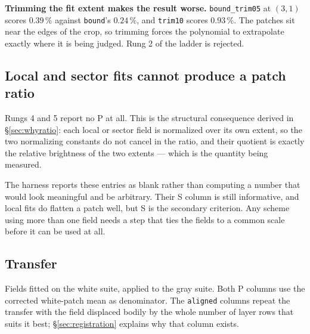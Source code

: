 \documentclass[11pt, a4paper]{article}
\newcommand{\code}[1]{\texttt{#1}}
\newcommand{\pct}{\,\%}
\begin{document}
\textbf{Trimming the fit extent makes the result worse.}
\code{bound\_trim05} at $(3,1)$ scores $0.39\pct$
against \code{bound}'s $0.24\pct$,
and \code{trim10} scores $0.93\pct$.
The patches sit near the edges of the crop,
so trimming forces the polynomial to extrapolate
exactly where it is being judged.
Rung 2 of the ladder is rejected.

\subsection{Local and sector fits cannot produce a patch ratio}
\label{sec:localfail}

Rungs 4 and 5 report no P at all.
This is the structural consequence derived in \S\ref{sec:whyratio}:
each local or sector field is normalized over its own extent,
so the two normalizing constants do not cancel in the ratio,
and their quotient is exactly the relative brightness of the two extents ---
which is the quantity being measured.

The harness reports these entries as blank
rather than computing a number that would look meaningful
and be arbitrary.
Their S column is still informative,
and local fits do flatten a patch well,
but S is the secondary criterion.
Any scheme using more than one field
needs a step that ties the fields to a common scale
before it can be used at all.

\subsection{Transfer}
\label{sec:transfer}

Fields fitted on the white suite, applied to the gray suite.
Both P columns use the corrected white-patch mean as denominator.
The \code{aligned} columns repeat the transfer
with the field displaced bodily by the whole number of layer rows
that suits it best;
\S\ref{sec:registration} explains why that column exists.
\end{document}
